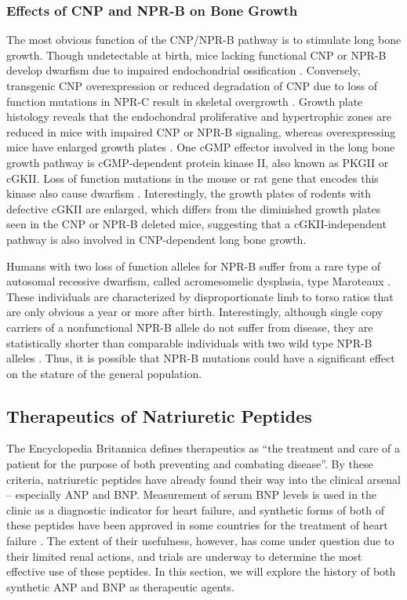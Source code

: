 \documentclass[14pt,a4paper,onecolumn]{article}
\begin{document}
\subsubsection{Effects of CNP and NPR-B on Bone Growth}
The most obvious function of the CNP/NPR-B pathway is to stimulate long bone growth. Though undetectable at birth, mice lacking functional CNP or NPR-B develop dwarfism due to impaired endochondrial ossification \citep{Chusho2001} \citep{Tamura2001} \citep{Tsuji2005}.
Conversely, transgenic CNP overexpression or reduced degradation of CNP due to loss of function mutations in NPR-C result in skeletal overgrowth \citep{Jaubert1999} \citep{Matsukawa1999}  \citep{Yasoda2004}. Growth plate histology reveals that the endochondral proliferative and hypertrophic zones are reduced in mice with impaired CNP or NPR-B signaling, whereas overexpressing mice have enlarged growth plates \citep{Chusho2001} \citep{Tamura2004} \citep{Yasoda2004}.
One cGMP effector involved in the long bone growth pathway is cGMP-dependent protein kinase II, also known as PKGII or cGKII. Loss of function mutations in the mouse or rat gene that encodes this kinase also cause dwarfism \citep{Chikuda2004} \citep{Pfeifer1996}. Interestingly, the growth plates of rodents with defective cGKII are enlarged, which differs from the diminished growth plates seen in the CNP or NPR-B deleted mice, suggesting that a cGKII-independent pathway is also involved in CNP-dependent long bone growth.

Humans with two loss of function alleles for NPR-B suffer from a rare type of autosomal recessive dwarfism, called acromesomelic dysplasia, type Maroteaux \citep{Bartels2004}. These individuals are characterized by disproportionate limb to torso ratios that are only obvious a year or more after birth. Interestingly, although single copy carriers of a nonfunctional NPR-B allele do not suffer from disease, they are statistically shorter than comparable individuals with two wild type NPR-B alleles \citep{Olney2006}. Thus, it is possible that NPR-B mutations could have a significant effect on the stature of the general population.

\subsection{Therapeutics of Natriuretic Peptides}
The Encyclopedia Britannica defines therapeutics as “the treatment and care of a patient for the purpose of both preventing and combating disease”. By these criteria, natriuretic peptides have already found their way into the clinical arsenal – especially ANP and BNP. Measurement of serum BNP levels is used in the clinic as a diagnostic indicator for heart failure, and synthetic forms of both of these peptides have been approved in some countries for the treatment of heart failure \citep{Gardner2003}. The extent of their usefulness, however, has come under question due to their limited renal actions, and trials are underway to determine the most effective use of these peptides. In this section, we will explore the history of both synthetic ANP and BNP as therapeutic agents.
\end{document}

